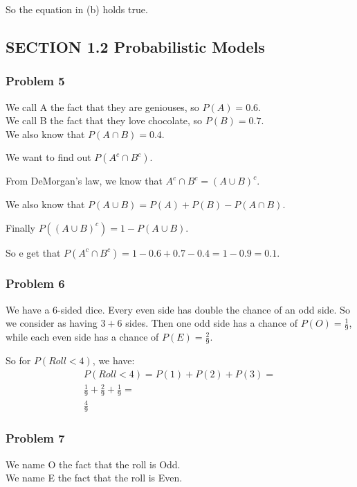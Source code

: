 \documentclass{article}
\begin{document}
So the equation in (b) holds true.

\subsection*{SECTION 1.2 Probabilistic Models}

\subsubsection*{Problem 5}

We call A the fact that they are geniouses, so $P(A) = 0.6$. \\
We call B the fact that they love chocolate, so $P(B) = 0.7$. \\
We also know that $P(A \cap B) = 0.4$.

We want to find out $P(A^{c} \cap B^{c})$.

From DeMorgan's law, we know that $A^{c} \cap B^{c} = (A \cup B)^{c}$.

We also know that $P(A \cup B) = P(A) + P(B) - P(A \cap B)$.

Finally $P((A \cup B)^{c}) = 1 - P(A \cup B)$.

So e get that $P(A^{c} \cap B^{c}) =1 - 0.6 + 0.7 - 0.4 = 1 - 0.9 = 0.1$.


\subsubsection*{Problem 6}

We have a 6-sided dice. Every even side has double the chance of an odd side. So we consider as having $3 + 6$ sides. Then one odd side has a chance of $P(O) = \frac{1}{9}$, while each even side has a chance of $P(E) = \frac{2}{9}$.

So for $P(Roll < 4)$, we have:
\begin{gather*}
    P(Roll < 4) = P(1) + P(2) + P(3) = \\
    \frac{1}{9} + \frac{2}{9} + \frac{1}{9} = \\
    \frac{4}{9}
\end{gather*}

\subsubsection*{Problem 7}

We name O the fact that the roll is Odd.\\
We name E the fact that the roll is Even.
\end{document}
